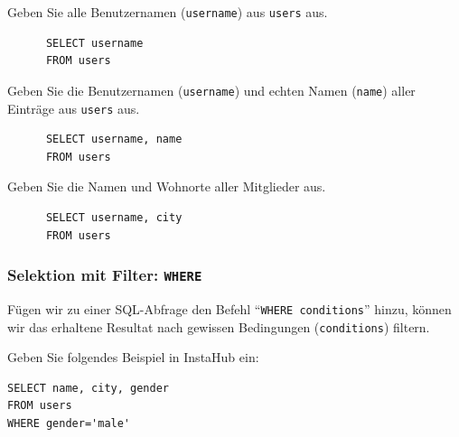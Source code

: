 \begin{myexercise}
  Geben Sie alle Benutzernamen (\texttt{username}) aus \texttt{users} aus.
  \begin{myanswer}
    \begin{lstlisting}
      SELECT username
      FROM users
      \end{lstlisting}
  \end{myanswer}
\end{myexercise}

\begin{myexercise}
  Geben Sie die Benutzernamen (\texttt{username}) und echten Namen (\texttt{name}) aller Einträge aus \texttt{users} aus.
  \begin{myanswer}
    \begin{lstlisting}
      SELECT username, name
      FROM users
    \end{lstlisting}
  \end{myanswer}
\end{myexercise}

\begin{myexercise}
  Geben Sie die Namen und Wohnorte aller Mitglieder aus.
  \begin{myanswer}
    \begin{lstlisting}
      SELECT username, city
      FROM users
    \end{lstlisting}
  \end{myanswer}
\end{myexercise}

\subsubsection*{Selektion mit Filter: \texorpdfstring{\lstinline|WHERE|}{WHERE}}
Fügen wir zu einer \gls{SQL}-Abfrage den Befehl \enquote{\lstinline|WHERE conditions|} hinzu, können wir das erhaltene Resultat nach gewissen Bedingungen (\texttt{conditions}) filtern.

\begin{myexample}
Geben Sie folgendes Beispiel in InstaHub ein:

\begin{lstlisting}
SELECT name, city, gender
FROM users
WHERE gender='male'
\end{lstlisting}
\end{myexample}

